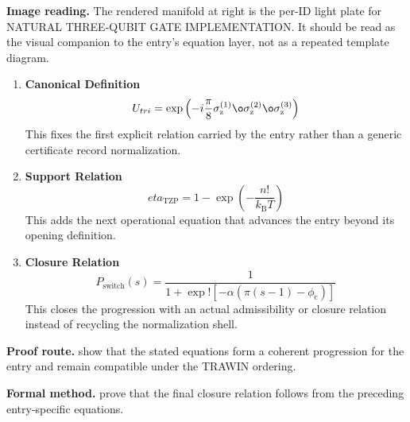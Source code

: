 \begin{samepage}
\noindent\begin{minipage}[t]{0.45\linewidth}
\vspace{0pt}
\raggedright
\scriptsize\textbf{Image reading.} The rendered manifold at right is the per-ID light plate for NATURAL THREE-QUBIT GATE IMPLEMENTATION. It should be read as the visual companion to the entry's equation layer, not as a repeated template diagram.\par
\end{minipage}\hfill
\begin{minipage}[t]{0.53\linewidth}
\vspace*{-0.10in}
\raggedright
{}
\end{minipage}
\end{samepage}

\clearpage


\begin{enumerate}[leftmargin=1.6em,itemsep=9pt,topsep=6pt]
\item \textbf{Canonical Definition}
\[
U_{tri} = \exp\left( -i\frac{\pi}{8} \sigma_{\mathrm{z}}^{(1)} \o\sigma_{\mathrm{z}}^{(2)} \o\sigma_{\mathrm{z}}^{(3)} \right)
\]
This fixes the first explicit relation carried by the entry rather than a generic certificate record normalization.

\item \textbf{Support Relation}
\[
eta_{\mathrm{TZP}} = 1 - \exp\!\left( - \frac{n!}{k_{\mathrm{B}} T} \right)
\]
This adds the next operational equation that advances the entry beyond its opening definition.

\item \textbf{Closure Relation}
\[
P_{\mathrm{switch}}(s) = \frac{1}{1+\exp!\left[-\alpha\left(\pi(s-1)-\phi_{\mathrm{c}}\right)\right]}
\]
This closes the progression with an actual admissibility or closure relation instead of recycling the normalization shell.
\end{enumerate}

\textbf{Proof route.} show that the stated equations form a coherent progression for the entry and remain compatible under the TRAWIN ordering.

\textbf{Formal method.} prove that the final closure relation follows from the preceding entry-specific equations.

